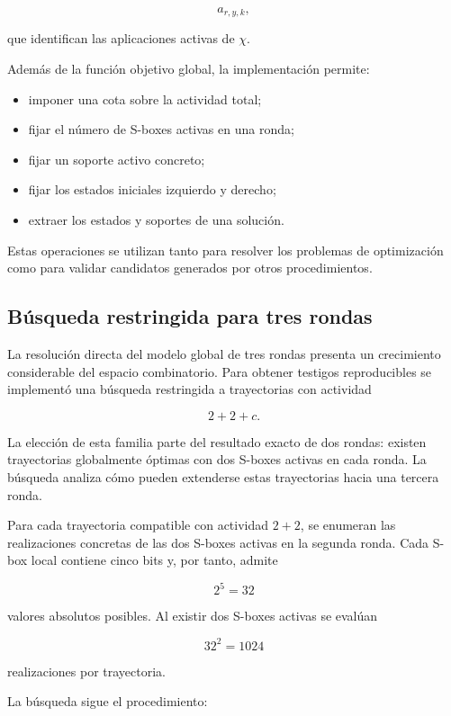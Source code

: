 \[
a_{r,y,k},
\]

que identifican las aplicaciones activas de $\chi$.

Además de la función objetivo global, la implementación permite:

\begin{itemize}
    \item imponer una cota sobre la actividad total;
    \item fijar el número de S-boxes activas en una ronda;
    \item fijar un soporte activo concreto;
    \item fijar los estados iniciales izquierdo y derecho;
    \item extraer los estados y soportes de una solución.
\end{itemize}

Estas operaciones se utilizan tanto para resolver los problemas de
optimización como para validar candidatos generados por otros
procedimientos.


\subsection{Búsqueda restringida para tres rondas}
\label{subsec:busqueda_restringida_implementacion}

La resolución directa del modelo global de tres rondas presenta un
crecimiento considerable del espacio combinatorio. Para obtener testigos
reproducibles se implementó una búsqueda restringida a trayectorias con
actividad

\[
2+2+c.
\]

La elección de esta familia parte del resultado exacto de dos rondas:
existen trayectorias globalmente óptimas con dos S-boxes activas en cada
ronda. La búsqueda analiza cómo pueden extenderse estas trayectorias hacia
una tercera ronda.

Para cada trayectoria compatible con actividad $2+2$, se enumeran las
realizaciones concretas de las dos S-boxes activas en la segunda ronda.
Cada S-box local contiene cinco bits y, por tanto, admite

\[
2^5=32
\]

valores absolutos posibles. Al existir dos S-boxes activas se evalúan

\[
32^2=1024
\]

realizaciones por trayectoria.

La búsqueda sigue el procedimiento:

